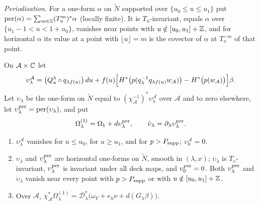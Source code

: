 \emph{Periodisation.} For a one-form $\alpha$ on $\widetilde N$ supported over $\{u_0\le u\le u_1\}$ put $\operatorname{per}(\alpha)=\sum_{m\in\mathbb{Z}}(T_u^m)^*\alpha$ (locally finite). It is $T_u$-invariant, equals $\alpha$ over $\{u_1-1<u<1+u_0\}$, vanishes near points with $u\notin[u_0,u_1]+\mathbb{Z}$, and for horizontal $\alpha$ its value at a point with $\lfloor u\rfloor=m$ is the covector of $\alpha$ at $T_u^{-m}$ of that point.

\begin{construction}\label{cons:shd4-eta}
On $\mathcal A\times\mathbb{C}$ let
\[
 \upsilon^{\mathcal A}_\lambda=\bigl(Q^\lambda_u\circ q_{\lambda f(u)}\bigr)\,du
 +f(u)\Bigl[H^*\bigl(p(q_\lambda^{-1}q_{\lambda f(u)}w_{\mathcal A})\bigr)-H^*\bigl(p(w_{\mathcal A})\bigr)\Bigr]\beta .
\]
Let $\upsilon_\lambda$ be the one-form on $\widetilde N$ equal to $(\chi_{\mathcal A}^{-1})^*\upsilon^{\mathcal A}_\lambda$ over $\mathcal A$ and to zero
elsewhere, let $\upsilon^{\rm per}_\lambda=\operatorname{per}(\upsilon_\lambda)$, and put
\[
 \Omega^{(1)}_\lambda=\Omega_1+d\upsilon^{\rm per}_\lambda,\qquad \dot\upsilon_\lambda=\partial_\lambda\upsilon^{\rm per}_\lambda .
\]
\end{construction}

\begin{lemma}\label{lem:shd4-eta}
\begin{enumerate}[label=(\alph*)]
\item $\upsilon^{\mathcal A}_\lambda$ vanishes for $u\le u_0$, for $u\ge u_1$, and for $p>P_{\rm supp}$; $\upsilon^{\mathcal A}_0=0$.
\item $\upsilon_\lambda$ and $\upsilon^{\rm per}_\lambda$ are horizontal one-forms on $\widetilde N$, smooth in $(\lambda,x)$; $\upsilon_\lambda$ is
$T_v$-invariant, $\upsilon^{\rm per}_\lambda$ is invariant under all deck maps, and $\upsilon^{\rm per}_0=0$. Both $\upsilon^{\rm per}_\lambda$ and $\dot\upsilon_\lambda$ vanish near every point with $p>P_{\rm supp}$ or with
$u\notin[u_0,u_1]+\mathbb{Z}$.
\item Over $\mathcal A$,
$\chi_{\mathcal A}^*\Omega^{(1)}_\lambda=\mathcal D_\lambda^*\bigl(\omega_V+e_h\nu+d(G_\lambda\beta)\bigr)$.
\end{enumerate}
\end{lemma}

